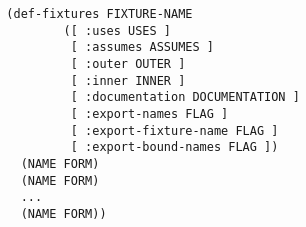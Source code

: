 \begin{verbatim}
  (def-fixtures FIXTURE-NAME
          ([ :uses USES ]
           [ :assumes ASSUMES ]
           [ :outer OUTER ]
           [ :inner INNER ]
           [ :documentation DOCUMENTATION ]
           [ :export-names FLAG ]
           [ :export-fixture-name FLAG ]
           [ :export-bound-names FLAG ])
    (NAME FORM)
    (NAME FORM)
    ...
    (NAME FORM))
\end{verbatim}
